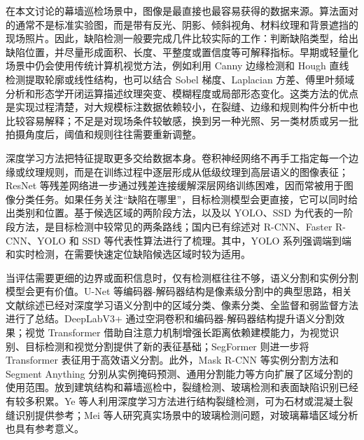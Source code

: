 在本文讨论的幕墙巡检场景中，图像是最直接也最容易获得的数据来源。算法面对的通常不是标准实验图，而是带有反光、阴影、倾斜视角、材料纹理和背景遮挡的现场照片。因此，缺陷检测一般要完成几件比较实际的工作：判断缺陷类型，给出缺陷位置，并尽量形成面积、长度、平整度或置信度等可解释指标。早期或轻量化场景中仍会使用传统计算机视觉方法，例如利用 Canny 边缘检测和 Hough 直线检测提取轮廓或线性结构，也可以结合 Sobel 梯度、Laplacian 方差、傅里叶频域分析和形态学开闭运算描述纹理突变、模糊程度或局部形态变化\cite{canny1986edge,duda1972hough}。这类方法的优点是实现过程清楚，对大规模标注数据依赖较小，在裂缝、边缘和规则构件分析中也比较容易解释；不足是对现场条件较敏感，换到另一种光照、另一类材质或另一批拍摄角度后，阈值和规则往往需要重新调整。

深度学习方法把特征提取更多交给数据本身。卷积神经网络不再手工指定每一个边缘或纹理规则，而是在训练过程中逐层形成从低级纹理到高层语义的图像表征；ResNet 等残差网络进一步通过残差连接缓解深层网络训练困难，因而常被用于图像分类任务\cite{article1,conf1}。如果任务关注“缺陷在哪里”，目标检测模型会更直接，它可以同时给出类别和位置。基于候选区域的两阶段方法，以及以 YOLO、SSD 为代表的一阶段方法，是目标检测中较常见的两条路线；国内已有综述对 R-CNN、Faster R-CNN、YOLO 和 SSD 等代表性算法进行了梳理\cite{fan2020objectdetection}。其中，YOLO 系列强调端到端和实时检测，在需要快速定位缺陷候选区域时较为适用\cite{redmon2016yolo}。

当评估需要更细的边界或面积信息时，仅有检测框往往不够，语义分割和实例分割模型会更有价值。U-Net 等编码器-解码器结构是像素级分割中的典型思路，相关文献综述已经对深度学习语义分割中的区域分类、像素分类、全监督和弱监督方法进行了总结\cite{tian2019semanticsegmentation}。DeepLabV3+ 通过空洞卷积和编码器-解码器结构提升语义分割效果\cite{chen2018deeplabv3plus}；视觉 Transformer 借助自注意力机制增强长距离依赖建模能力，为视觉识别、目标检测和视觉分割提供了新的表征基础\cite{zhou2023visiontransformer}；SegFormer 则进一步将 Transformer 表征用于高效语义分割\cite{xie2021segformer}。此外，Mask R-CNN 等实例分割方法和 Segment Anything 分别从实例掩码预测、通用分割能力等方向扩展了区域分割的使用范围\cite{su2022instancesegmentation,kirillov2023sam}。放到建筑结构和幕墙巡检中，裂缝检测、玻璃检测和表面缺陷识别已经有较多积累。Ye 等人利用深度学习方法进行结构裂缝检测，可为石材或混凝土裂缝识别提供参考\cite{ye2019crack}；Mei 等人研究真实场景中的玻璃检测问题，对玻璃幕墙区域分析也具有参考意义\cite{mei2020glass}。

